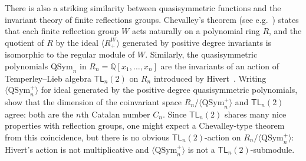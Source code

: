 \documentclass[12pt]{amsart}
\theoremstyle{definition}
\theoremstyle{remark}
\numberwithin{equation}{section}
\newcommand{\QQ}{\mathbb{Q}}
\newcommand{\TL}{\mathsf{TL}}
\newcommand{\QSym}{\mathrm{QSym}}
\begin{document}
There is also a striking similarity between quasisymmetric functions and the invariant theory of finite reflections groups.  
Chevalley's theorem (see e.g.~\cite{Humphrey}) states that each finite reflection group $W$ acts naturally on a polynomial ring $R$, and the quotient of $R$ by the ideal $\langle R_{+}^{W} \rangle$ generated by positive degree invariants is isomorphic to the regular module of $W$.  
Similarly, the quasisymmetric polynomials $\QSym_{n}$ in $R_{n} = \QQ[x_{1}, \ldots, x_{n}]$ are the invariants of an action of  Temperley--Lieb algebra $\TL_{n}(2)$ on $R_{n}$  introduced by Hivert~\cite{Hivert}.  
Writing $\langle \QSym_{n}^{+} \rangle$
for ideal generated by the positive degree quasisymmetric polynomials,~\cite{AB,ABB} show that the dimension of the coinvariant space $R_{n}/\langle \QSym_{n}^{+} \rangle$ and $\TL_{n}(2)$ agree: both are the $n$th Catalan number $C_{n}$.  
Since $\TL_{n}(2)$ shares many nice properties with reflection groups, one might expect a Chevalley-type theorem from this coincidence, but there is no obvious $\TL_{n}(2)$-action on $R_{n}/\langle \QSym_{n}^{+} \rangle$:  Hivert's action is not multiplicative and $\langle \QSym_{n}^{+} \rangle$ is not a $\TL_{n}(2)$-submodule.  
\end{document}
